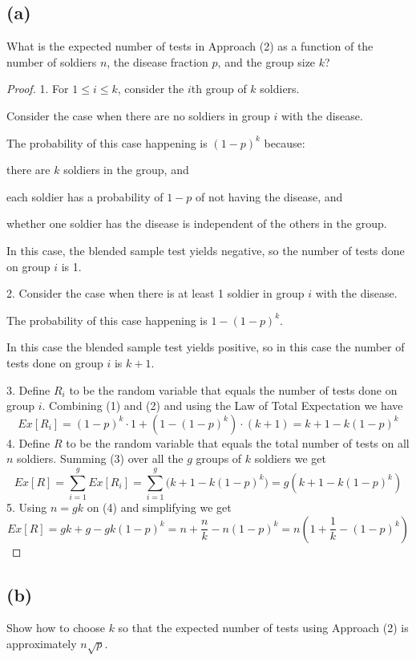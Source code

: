 \documentclass[14pt]{extarticle}
\begin{document}
\subsection{(a)}
What is the expected number of tests in Approach (2) as a function of the number of soldiers $n$, the disease fraction $p$, and the group size $k$?
\begin{proof}
1. For $1 \leq i \leq k$, consider the $i$th group of $k$ soldiers. 

Consider the case when there are no soldiers in group $i$ with the disease. 

The probability of this case happening is $(1-p)^k$ because: 

there are $k$ soldiers in the group, and 

each soldier has a probability of $1-p$ of not having the disease, and 

whether one soldier has the disease is independent of the others in the group. 

In this case, the blended sample test yields negative, so the number of tests done on group $i$ is 1.

2. Consider the case when there is at least 1 soldier in group $i$ with the disease. 

The probability of this case happening is $1 - (1-p)^k$.

In this case the blended sample test yields positive, so in this case the number of tests done on group $i$ is $k + 1$.

3. Define $R_i$ to be the random variable that equals the number of tests done on group $i$. Combining (1) and (2) and using the Law of Total Expectation we have
$$
Ex[R_i] = (1-p)^k \cdot 1 + (1 - (1-p)^k) \cdot (k+1) = k + 1 - k(1-p)^k
$$
4. Define $R$ to be the random variable that equals the total number of tests on all $n$ soldiers. Summing (3) over all the $g$ groups of $k$ soldiers we get
$$
Ex[R] = \sum_{i = 1}^{g}Ex[R_i] = \sum_{i = 1}^{g} \Big(k + 1 - k(1-p)^k\Big) = g(k + 1 - k(1-p)^k) 
$$
5. Using $n = gk$ on (4) and simplifying we get
$$
Ex[R] = gk + g - gk(1-p)^k = n + \frac{n}{k} - n(1-p)^k = n(1 + \frac{1}{k} - (1-p)^k)
$$
\end{proof}

\subsection{(b)}
Show how to choose $k$ so that the expected number of tests using Approach (2) is approximately $n \sqrt{p}$.
\end{document}

